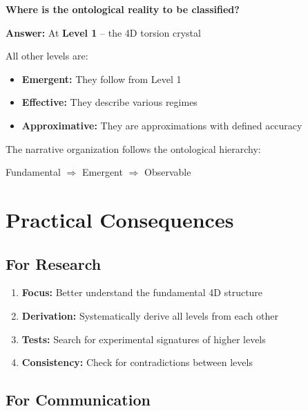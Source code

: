 	\begin{important}
		\textbf{Where is the ontological reality to be classified?}
		
		\vspace{0.3cm}
		
		\textbf{Answer:} At \textbf{Level 1} -- the 4D torsion crystal
		
		\vspace{0.3cm}
		
		All other levels are:
		\begin{itemize}
			\item \textbf{Emergent:} They follow from Level 1
			\item \textbf{Effective:} They describe various regimes
			\item \textbf{Approximative:} They are approximations with defined accuracy
		\end{itemize}
		
		\vspace{0.3cm}
		
		The narrative organization follows the ontological hierarchy:
		\begin{center}
			
			Fundamental $\Rightarrow$ Emergent $\Rightarrow$ Observable
		\end{center}
	\end{important}
	
	\section{Practical Consequences}
	
	\subsection{For Research}
	
	\begin{enumerate}
		\item \textbf{Focus:} Better understand the fundamental 4D structure
		\item \textbf{Derivation:} Systematically derive all levels from each other
		\item \textbf{Tests:} Search for experimental signatures of higher levels
		\item \textbf{Consistency:} Check for contradictions between levels
	\end{enumerate}
	
	\subsection{For Communication}
	
